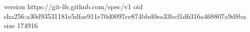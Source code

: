 version https://git-lfs.github.com/spec/v1
oid sha256:a30d93531181e5dfae911e70d0097ce874bbd0ea33bcf1d6316a468807a9d8ba
size 174916

